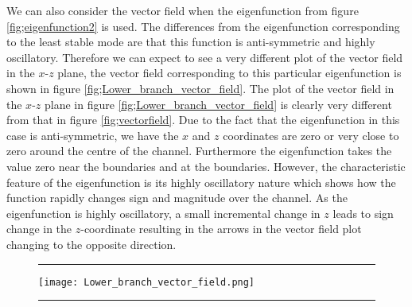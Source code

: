 \documentclass[a4paper, 12pt, twoside, openright]{article}
\numberwithin{equation}{section}
\begin{document}
We can also consider the vector field when the eigenfunction from figure \ref{fig;eigenfunction2} is used. The differences from the eigenfunction corresponding to the least stable mode are that this function is anti-symmetric and highly oscillatory. Therefore we can expect to see a very different plot of the vector field in the $x$-$z$ plane, the vector field corresponding to this particular eigenfunction is shown in figure \ref{fig;Lower_branch_vector_field}. The plot of the vector field in the $x$-$z$ plane in figure \ref{fig;Lower_branch_vector_field} is clearly very different from that in figure \ref{fig;vectorfield}. Due to the fact that the eigenfunction in this case is anti-symmetric, we have the $x$ and $z$ coordinates are zero or very close to zero around the centre of the channel. Furthermore the eigenfunction takes the value zero near the boundaries and at the boundaries. However, the characteristic feature of the eigenfunction is its highly oscillatory nature which shows how the function rapidly changes sign and magnitude over the channel. As the eigenfunction is highly oscillatory, a small incremental change in $z$ leads to sign change in the $z$-coordinate resulting in the arrows in the vector field plot changing to the opposite direction.%
\begin{figure}[ht]
\centering
\rule{\linewidth}{1.5pt}
\texttt{[image: Lower\_branch\_vector\_field.png]}
\rule{\linewidth}{1.5pt}
\end{figure}
\end{document}
